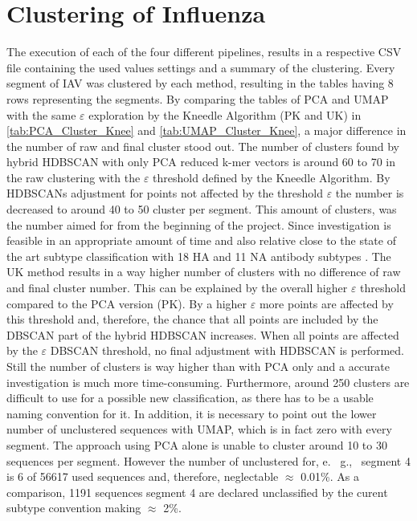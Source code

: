 \section{Clustering of Influenza} \label{sec:Clustering}

The execution of each of the four different pipelines, results in a respective CSV file containing the used values settings and a summary of the clustering. Every segment of \gls{IAV} was clustered by each method, resulting in the tables having 8 rows representing the segments. By comparing the tables of \gls{PCA} and \gls{UMAP} with the same $\varepsilon$ exploration by the Kneedle Algorithm (PK and UK) in \autoref{tab:PCA_Cluster_Knee} and \autoref{tab:UMAP_Cluster_Knee}, a major difference in the number of raw and final cluster stood out. The number of clusters found by hybrid \gls{HDBSCAN} with only \gls{PCA} reduced k-mer vectors is around 60 to 70 in the raw clustering with the $\varepsilon$ threshold defined by the Kneedle Algorithm. By \glspl{HDBSCAN} adjustment for points not affected by the threshold $\varepsilon$ the number is decreased to around 40 to 50 cluster per segment. This amount of clusters, was the number aimed for from the beginning of the project. Since investigation is feasible in an appropriate amount of time and also relative close to the state of the art subtype classification with 18 \gls{HA} and 11 \gls{NA} antibody subtypes \autocite{noauthor_revision_1980}. The UK method results in a way higher number of clusters with no difference of raw and final cluster number. This can be explained by the overall higher $\varepsilon$ threshold compared to the \gls{PCA} version (PK). By a higher $\varepsilon$ more points are affected by this threshold and, therefore, the chance that all points are included by the \gls{DBSCAN} part of the hybrid \gls{HDBSCAN} increases. When all points are affected by the $\varepsilon$ \gls{DBSCAN} threshold, no final adjustment with \gls{HDBSCAN} is performed. Still the number of clusters is way higher than with \gls{PCA} only and a accurate investigation is much more time-consuming. Furthermore, around 250 clusters are difficult to use for a possible new classification, as there has to be a usable naming convention for it. In addition, it is necessary to point out the lower number of unclustered sequences with \gls{UMAP}, which is in fact zero with every segment. The approach using \gls{PCA} alone is unable to cluster around 10 to 30 sequences per segment. However the number of unclustered for, e.~ g.,~ segment 4 is 6 of 56617 used sequences and, therefore, neglectable $\approx$ 0.01\%. As a comparison, 1191 sequences segment 4 are declared unclassified by the curent subtype convention making $\approx$ 2\%. 

